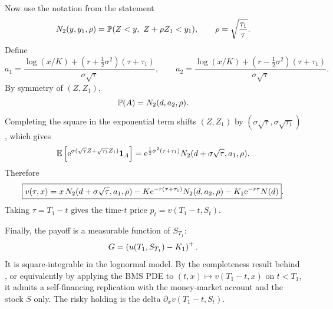 \begin{exercise}
\begin{solution}
Now use the notation from the statement
\[
  N_2(y,y_1,\rho)=\P(Z<y,\ Z+\rho Z_1<y_1),
  \qquad
  \rho=\sqrt{\frac{\tau_1}{\tau}}.
\]
Define
\[
  a_1=\frac{\log(x/K)+(r+\frac12\sigma^2)(\tau+\tau_1)}
            {\sigma\sqrt{\tau}},
  \qquad
  a_2=\frac{\log(x/K)+(r-\frac12\sigma^2)(\tau+\tau_1)}
            {\sigma\sqrt{\tau}}.
\]
By symmetry of \((Z,Z_1)\),
\[
  \P(A)=N_2(d,a_2,\rho).
\]
Completing the square in the exponential term shifts
\((Z,Z_1)\) by \((\sigma\sqrt{\tau},\sigma\sqrt{\tau_1})\), which gives
\[
  \E\left[
    \e^{\sigma(\sqrt{\tau}Z+\sqrt{\tau_1}Z_1)}
    \1_A
  \right]
  =
  \e^{\frac12\sigma^2(\tau+\tau_1)}
  N_2(d+\sigma\sqrt{\tau},a_1,\rho).
\]
Therefore
\[
  \boxed{
  v(\tau,x)
    =
    x\,N_2(d+\sigma\sqrt{\tau},a_1,\rho)
    -K\e^{-r(\tau+\tau_1)}N_2(d,a_2,\rho)
    -K_1\e^{-r\tau}\normalcdf(d)
  }.
\]
Taking \(\tau=T_1-t\) gives the time-\(t\) price \(p_t=v(T_1-t,S_t)\).

Finally, the payoff is a measurable function of \(S_{T_1}\):
\[
  G=\pos{u(T_1,S_{T_1})-K_1}.
\]
It is square-integrable in the lognormal model.  By the completeness result
behind , or equivalently by applying the BMS PDE to
\((t,x)\mapsto v(T_1-t,x)\) on \(t<T_1\), it admits a self-financing
replication with the money-market account and the stock \(S\) only.  The risky
holding is the delta \(\partial_xv(T_1-t,S_t)\).
\end{solution}
\end{exercise}
